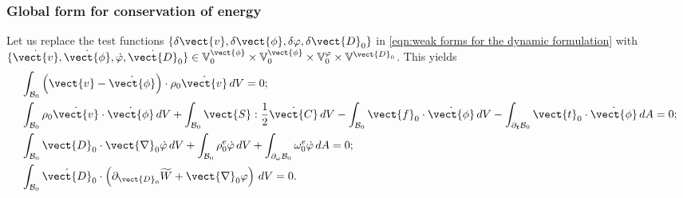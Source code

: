 \subsubsection{Global form for conservation of energy}\label{eqn:conservation of energy}

Let us replace the test functions
$\{\delta\vect{v},\delta\vect{\phi},\delta\varphi,\delta\vect{D}_0\}$ in \eqref{eqn:weak forms for the dynamic formulation} with $\{\dot{\vect{v}},\dot{\vect{\phi}},\dot\varphi,\dot{\vect{D}}_0\}\in\mathbb{V}_0^{\vect{\phi}}\times\mathbb{V}_0^{\vect{\phi}}\times\mathbb{V}^{\varphi}_0\times\mathbb{V}^{\vect{D}_0}$. 
This yields
%
\begin{equation}\label{eqn:weak forms for the dynamic formulation Dirichlet bcs}
\begin{aligned}
&\int_{\mathcal{B}_0}\left(\vect{v} - \dot{\vect{\phi}}\right)\cdot\rho_0\dot{\vect{v}}\,dV=0;\\
%
&\int_{\mathcal{B}_0}\rho_0\dot{\vect{v}}\cdot\dot{\vect{\phi}}\,dV + \int_{\mathcal{B}_0}\vect{S}:\frac{1}{2}\dot{\vect{C}}\,dV-  \int_{\mathcal{B}_0}\vect{f}_0\cdot\dot{\vect{\phi}}\,dV-
\int_{\partial_{\boldsymbol{t}}\mathcal{B}_0}\vect{t}_0\cdot\dot{\vect{\phi}}\,dA=0 ;\\
%
&\int_{\mathcal{B}_0}\vect{D}_0\cdot\vect{\nabla}_0\dot{\varphi}\,dV+  \int_{\mathcal{B}_0}\rho_0^e\dot{\varphi}\,dV + 
\int_{\partial_{\omega}\mathcal{B}_0}\omega^e_0\dot{\varphi}\,dA=0;\\
%
&\int_{\mathcal{B}_0}\dot{\vect{D}}_0\cdot \left(\partial_{\vect{D}_0}\widetilde{W} + \vect{\nabla}_0\varphi\right)\,dV=0.
%
\end{aligned}
\end{equation}

%

